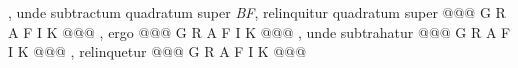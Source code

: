                     , unde subtractum quadratum super \textit{BF},  relinquitur quadratum super @@@ G R A F I K @@@%
                    , ergo @@@ G R A F I K @@@%
                    ,  unde subtrahatur @@@ G R A F I K @@@%
                    , relinquetur @@@ G R A F I K @@@%
